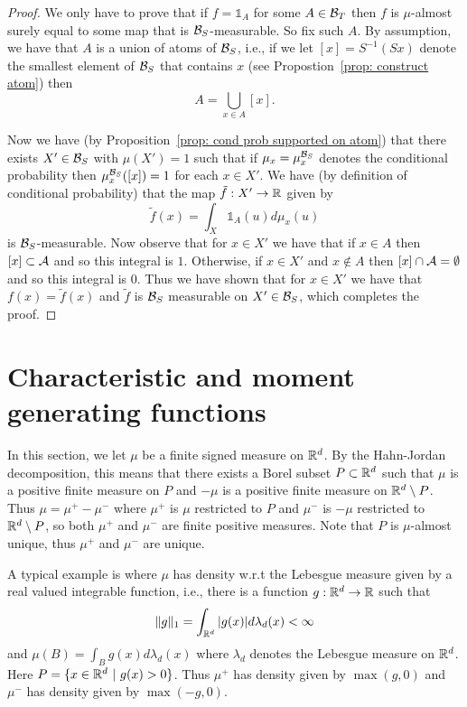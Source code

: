 \documentclass[twoside, a4paper, 10pt]{amsart}
\begin{document}
\begin{proof} We only have to prove that if $f = \mathds{1}_A$ for some $A \in \mathcal{B}_T$ then $f$ is $\mu$-almost surely equal to some map that is $\mathcal{B}_S$-measurable. So fix such $A$. By assumption, we have that $A$ is a union of atoms of $\mathcal{B}_S$, i.e., if we let $[x] = S^{-1}(Sx)$ denote the smallest element of $\mathcal{B}_S$ that contains $x$ (see Propostion~\ref{prop: construct atom}) then $$A = \bigcup_{x \in A} [x].$$

Now we have (by Proposition~\ref{prop: cond prob supported on atom}) that there exists $X' \in \mathcal{B}_S$ with $\mu(X')=1$ such that if $\mu_x = \mu_x^{\mathcal{B}_S}$ denotes the conditional probability then $\mu_x^{\mathcal{B}_S}([x])=1$ for each $x \in X'$. We have (by definition of conditional probability) that the map $\tilde{f}:X' \to \mathbb{R}$ given by $$ \tilde{f}(x) = \int_X \mathds{1}_A(u) d\mu_x(u)$$ is $\mathcal{B}_S$-measurable.
Now observe that for $x \in X'$ we have that if $x \in A $ then $[x] \subset \mathcal{A}$ and so this integral is $1$. Otherwise, if $x \in X'$ and $x \notin A$ then $[x] \cap \mathcal{A} = \emptyset$ and so this integral is $0$. Thus we have shown that for $x \in X'$ we have that $f(x) = \tilde{f}(x)$ and $\tilde{f}$ is $\mathcal{B}_S$ measurable on $X' \in \mathcal{B}_S$, which completes the proof. \end{proof}

\section{Characteristic and moment generating functions}

In this section, we let $\mu$ be a finite signed measure on $\mathbb{R}^d$. By the Hahn-Jordan decomposition, this means that there exists a Borel subset $P \subset \mathbb{R}^d$ such that $\mu$ is a positive finite measure on $P$ and $-\mu$ is a positive finite measure on $\mathbb{R}^d \setminus P$. Thus $\mu = \mu^+ - \mu^-$ where $\mu^+$ is $\mu$ restricted to $P$ and $\mu^-$ is $-\mu$ restricted to $\mathbb{R}^d \setminus P$, so both $\mu^{+}$ and $\mu^{-}$ are finite positive measures. Note that $P$ is $\mu$-almost unique, thus $\mu^{+}$ and $\mu^{-}$ are unique.

\begin{eg} A typical example is where $\mu$ has density w.r.t the Lebesgue measure given by a real valued integrable function, i.e., there is a function $g:\mathbb{R}^d \to \mathbb{R}$ such that $$\|g\|_1 = \int_{\mathbb{R}^d} |g(x)| d\lambda_d(x) < \infty$$ and $\mu(B) = \int_{B} g(x) d\lambda_d(x)$ where $\lambda_d$ denotes the Lebesgue measure on $\mathbb{R}^d$. Here $P = \{x \in \mathbb{R}^d ~|~ g(x) > 0 \}$. Thus $\mu^+$ has density given by $\max(g,0)$ and $\mu^-$ has density given by $\max(-g,0)$.
\end{eg}
\end{document}
